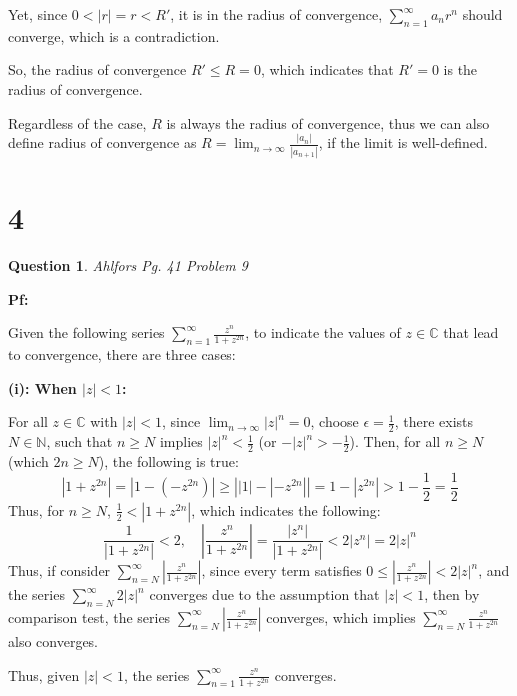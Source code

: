 \documentclass{article}
\newtheorem{question}{Question}
\begin{document}
Yet, since $0<|r|=r<R'$, it is in the radius of convergence, $\sum_{n=1}^{\infty}a_nr^n$ should converge, which is a contradiction.

So, the radius of convergence $R'\leq R=0$, which indicates that $R'=0$ is the radius of convergence.

\hfill

\hfill

\hfill

Regardless of the case, $R$ is always the radius of convergence, thus we can also define radius of convergence as $R=\lim_{n\rightarrow\infty}\frac{|a_n|}{|a_{n+1}|}$, if the limit is well-defined.

\break

\section*{4}
\begin{question}
    Ahlfors Pg. 41 Problem 9
\end{question}

\textbf{Pf:}

Given the following series $\sum_{n=1}^{\infty}\frac{z^n}{1+z^{2n}}$, to indicate the values of $z\in\mathbb{C}$ that lead to convergence, there are three cases:

\hfill

\textbf{(i): When $|z|<1$:}

For all $z\in\mathbb{C}$ with $|z|<1$, since $\lim_{n\rightarrow\infty}|z|^n=0$, choose $\epsilon=\frac{1}{2}$, there exists $N\in\mathbb{N}$, such that 
$n\geq N$ implies $|z|^n < \frac{1}{2}$ (or $-|z|^n > -\frac{1}{2}$). Then, for all $n\geq N$ (which $2n\geq N$), the following is true:
$$|1+z^{2n}| = |1-(-z^{2n})| \geq \left||1|-|-z^{2n}|\right| = 1-|z^{2n}| > 1-\frac{1}{2}=\frac{1}{2}$$
Thus, for $n\geq N$, $\frac{1}{2} < |1+z^{2n}|$, which indicates the following:
$$\frac{1}{|1+z^{2n}|}<2,\quad \left|\frac{z^n}{1+z^{2n}}\right| =\frac{|z^n|}{|1+z^{2n}|}<2|z^n|=2|z|^n$$
Thus, if consider $\sum_{n=N}^{\infty}\left|\frac{z^n}{1+z^{2n}}\right|$, since every term satisfies $0\leq\left|\frac{z^n}{1+z^{2n}}\right|<2|z|^n$, and the series $\sum_{n=N}^{\infty}2|z|^n$ 
converges due to the assumption that $|z|<1$, then by comparison test, the series $\sum_{n=N}^{\infty}\left|\frac{z^n}{1+z^{2n}}\right|$ converges, which implies
$\sum_{n=N}^{\infty}\frac{z^n}{1+z^{2n}}$ also converges.

Thus, given $|z|<1$, the series $\sum_{n=1}^{\infty}\frac{z^n}{1+z^{2n}}$ converges.
\end{document}
